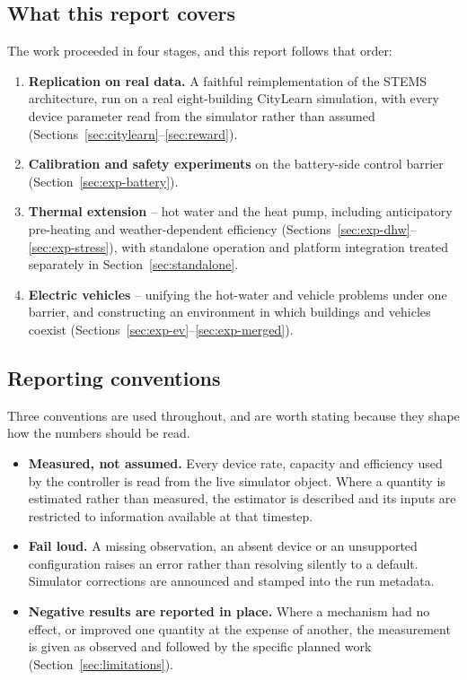 \documentclass[11pt]{article}
\begin{document}
\subsection{What this report covers}

The work proceeded in four stages, and this report follows that order:

\begin{enumerate}[nosep]
\item \textbf{Replication on real data.} A faithful reimplementation of the
STEMS architecture, run on a real eight-building CityLearn simulation, with
every device parameter read from the simulator rather than assumed
(Sections~\ref{sec:citylearn}--\ref{sec:reward}).
\item \textbf{Calibration and safety experiments} on the battery-side control
barrier (Section~\ref{sec:exp-battery}).
\item \textbf{Thermal extension} -- hot water and the heat pump, including
anticipatory pre-heating and weather-dependent efficiency
(Sections~\ref{sec:exp-dhw}--\ref{sec:exp-stress}), with standalone operation and
platform integration treated separately in Section~\ref{sec:standalone}.
\item \textbf{Electric vehicles} -- unifying the hot-water and vehicle problems
under one barrier, and constructing an environment in which buildings and
vehicles coexist (Sections~\ref{sec:exp-ev}--\ref{sec:exp-merged}).
\end{enumerate}

\subsection{Reporting conventions}

Three conventions are used throughout, and are worth stating because they shape
how the numbers should be read.

\begin{itemize}[nosep]
\item \textbf{Measured, not assumed.} Every device rate, capacity and efficiency
used by the controller is read from the live simulator object. Where a quantity
is estimated rather than measured, the estimator is described and its inputs are
restricted to information available at that timestep.
\item \textbf{Fail loud.} A missing observation, an absent device or an
unsupported configuration raises an error rather than resolving silently to a
default. Simulator corrections are announced and stamped into the run metadata.
\item \textbf{Negative results are reported in place.} Where a mechanism had no
effect, or improved one quantity at the expense of another, the measurement is
given as observed and followed by the specific planned work
(Section~\ref{sec:limitations}).
\end{itemize}
\end{document}
